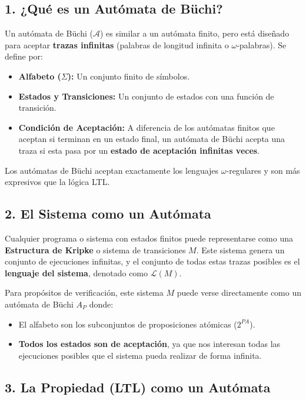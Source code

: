 \documentclass[11pt,a4paper]{article}
\begin{document}
\subsection{1. ¿Qué es un Autómata de Büchi?}

Un autómata de Büchi ($\mathcal{A}$) es similar a un autómata finito, pero está diseñado para aceptar \textbf{trazas infinitas} (palabras de longitud infinita o $\omega$-palabras). Se define por:
\begin{itemize}
    \item \textbf{Alfabeto ($\Sigma$):} Un conjunto finito de símbolos.
    \item \textbf{Estados y Transiciones:} Un conjunto de estados con una función de transición.
    \item \textbf{Condición de Aceptación:} A diferencia de los autómatas finitos que aceptan si terminan en un estado final, un autómata de Büchi acepta una traza si esta pasa por un \textbf{estado de aceptación infinitas veces}.
\end{itemize}

Los autómatas de Büchi aceptan exactamente los lenguajes $\omega$-regulares y son más expresivos que la lógica LTL.

\subsection{2. El Sistema como un Autómata}

Cualquier programa o sistema con estados finitos puede representarse como una \textbf{Estructura de Kripke} o sistema de transiciones $M$. Este sistema genera un conjunto de ejecuciones infinitas, y el conjunto de todas estas trazas posibles es el \textbf{lenguaje del sistema}, denotado como $\mathcal{L}(M)$.

Para propósitos de verificación, este sistema $M$ puede verse directamente como un autómata de Büchi $A_P$ donde:
\begin{itemize}
    \item El alfabeto son los subconjuntos de proposiciones atómicas ($2^{PA}$).
    \item \textbf{Todos los estados son de aceptación}, ya que nos interesan todas las ejecuciones posibles que el sistema pueda realizar de forma infinita.
\end{itemize}

\subsection{3. La Propiedad (LTL) como un Autómata}
\end{document}
